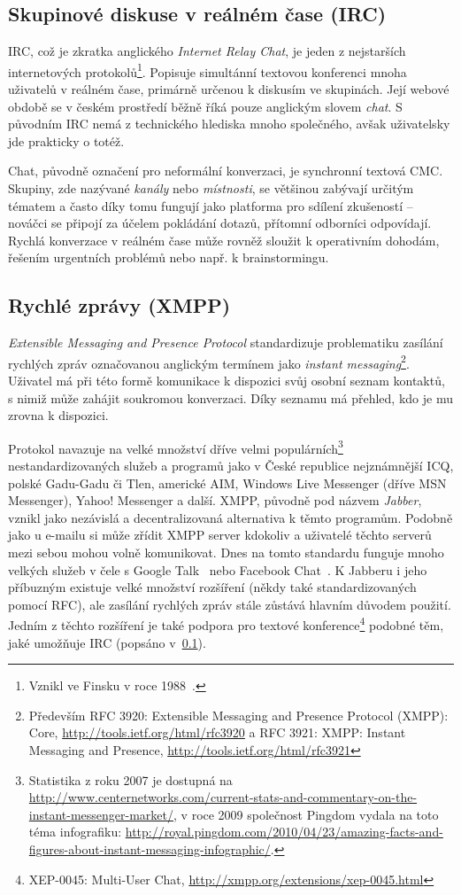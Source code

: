 \documentclass[12pt,oneside,final]{fithesis2}
\begin{document}
\subsection{Skupinové diskuse v reálném čase (IRC)}\label{irc}
IRC, což je zkratka anglického \emph{Internet Relay Chat}, je jeden z nejstarších internetových protokolů\footnote{Vznikl ve Finsku v roce 1988~\cite{oikarinen2011founding}.}. Popisuje simultánní textovou konferenci mnoha uživatelů v reálném čase, primárně určenou k diskusím ve skupinách. Její webové obdobě se v českém prostředí běžně říká pouze anglickým slovem \emph{chat}. S původním IRC nemá z technického hlediska mnoho společného, avšak uživatelsky jde prakticky o totéž.

Chat, původně označení pro neformální konverzaci, je synchronní textová CMC. Skupiny, zde nazývané \emph{kanály} nebo \emph{místnosti}, se většinou zabývají určitým tématem a často díky tomu fungují jako platforma pro sdílení zkušeností -- nováčci se připojí za účelem pokládání dotazů, přítomní odborníci odpovídají. Rychlá konverzace v reálném čase může rovněž sloužit k operativním dohodám, řešením urgentních problémů nebo např. k brainstormingu.

\subsection{Rychlé zprávy (XMPP)}\label{xmpp}
\emph{Extensible Messaging and Presence Protocol} standardizuje problematiku zasílání rychlých zpráv označovanou anglickým termínem jako \emph{instant messaging}\footnote{Především RFC 3920: Extensible Messaging and Presence Protocol (XMPP): Core, \url{http://tools.ietf.org/html/rfc3920} a RFC 3921: XMPP: Instant Messaging and Presence, \url{http://tools.ietf.org/html/rfc3921}}. Uživatel má při této formě komunikace k dispozici svůj osobní seznam kontaktů, s nimiž může zahájit soukromou konverzaci. Díky seznamu má přehled, kdo je mu zrovna k dispozici.

Protokol navazuje na velké množství dříve velmi populárních\footnote{Statistika z roku 2007 je dostupná na \url{http://www.centernetworks.com/current-stats-and-commentary-on-the-instant-messenger-market/}, v roce 2009 společnost Pingdom vydala na toto téma infografiku: \url{http://royal.pingdom.com/2010/04/23/amazing-facts-and-figures-about-instant-messaging-infographic/}.} nestandardizovaných služeb a programů jako v České republice nejznámnější ICQ, polské Gadu-Gadu či Tlen, americké AIM, Windows Live Messenger (dříve MSN Messenger), Yahoo! Messenger a další. XMPP, původně pod názvem \emph{Jabber}, vznikl jako nezávislá a decentralizovaná alternativa k těmto programům. Podobně jako u e-mailu si může zřídit XMPP server kdokoliv a uživatelé těchto serverů mezi sebou mohou volně komunikovat. Dnes na tomto standardu funguje mnoho velkých služeb v čele s Google Talk~\cite{bau2005google} nebo Facebook Chat~\cite{reiss2010facebook}. K Jabberu i jeho příbuzným existuje velké množství rozšíření (někdy také standardizovaných pomocí RFC), ale zasílání rychlých zpráv stále zůstává hlavním důvodem použití. Jedním z těchto rozšíření je také podpora pro textové konference\footnote{XEP-0045: Multi-User Chat, \url{http://xmpp.org/extensions/xep-0045.html}} podobné těm, jaké umožňuje IRC (popsáno v~\ref{irc}).
\end{document}
